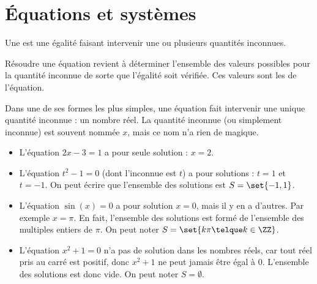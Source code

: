 \section{Équations et systèmes}
\begin{frame}
\begin{definition}
  Une  est une égalité faisant intervenir une ou plusieurs quantités inconnues.\pause

  Résoudre une équation revient à déterminer l'ensemble des valeurs possibles pour la quantité inconnue de sorte que l'égalité soit vérifiée. Ces valeurs sont les  de l'équation.
\end{definition}

Dans une de ses formes les plus simples, une équation fait intervenir une unique quantité inconnue : un nombre réel. La \og quantité inconnue\fg{} (ou simplement \og inconnue\fg{}) est souvent nommée \(x\), mais ce nom n'a rien de magique.
\end{frame}
\begin{frame}
\begin{example}
  \begin{itemize}[<+->]
  \item L'équation \(2x - 3 = 1\) a pour seule solution : \(x = 2\).
  \item L'équation \(t^{2} - 1 = 0\) (dont l'inconnue est \(t\)) a pour solutions : \(t = 1\) et \(t = -1\). On peut écrire que l'ensemble des solutions est \(S = \set{-1,1}\).
  \item L'équation \(\sin(x) = 0\) a pour solution \(x = 0\), mais il y en a d'autres. \pause Par exemple \(x = \pi\). \pause En fait, l'ensemble des solutions est formé de l'ensemble des multiples entiers de \(\pi\). On peut noter \(S = \set{k \pi \telque k \in \ZZ}\).
  \item L'équation \(x^{2} + 1 = 0\) n'a pas de solution dans les nombres réels, car tout réel pris au carré est positif, donc \(x^{2}+1\) ne peut jamais être égal à \(0\). L'ensemble des solutions est donc vide. On peut noter \(S = \emptyset\).
  \end{itemize}
\end{example}
\end{frame}

